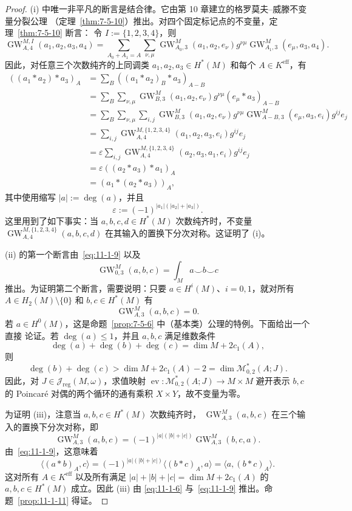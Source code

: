 \begin{proof}
(i) 中唯一非平凡的断言是结合律。它由第 10 章建立的格罗莫夫--威滕不变量分裂公理
（定理~\ref{thm:7-5-10}）推出。对四个固定标记点的不变量，定理~\ref{thm:7-5-10} 断言：
令 $I:=\{1,2,3,4\}$，则
\[
  \operatorname{GW}_{A,4}^{M,I}(a_1,a_2,a_3,a_4)
  =\sum_{A_0+A_1=A}\sum_{\nu,\mu}
  \operatorname{GW}_{A_0,3}^M(a_1,a_2,e_\nu)g^{\nu\mu}
  \operatorname{GW}_{A_1,3}^M(e_\mu,a_3,a_4).
\]
因此，对任意三个次数纯齐的上同调类 $a_1,a_2,a_3\in H^*(M)$ 和每个
$A\in K^{\mathrm{eff}}$，有
\[
\begin{aligned}
  ((a_1*a_2)*a_3)_A
  &=\sum_B((a_1*a_2)_B*a_3)_{A-B}\\
  &=\sum_B\sum_{\nu,\mu}
    \operatorname{GW}_{B,3}^M(a_1,a_2,e_\nu)g^{\nu\mu}
    (e_\mu*a_3)_{A-B}\\
  &=\sum_B\sum_{\nu,\mu}\sum_{i,j}
    \operatorname{GW}_{B,3}^M(a_1,a_2,e_\nu)g^{\nu\mu}
    \operatorname{GW}_{A-B,3}^M(e_\mu,a_3,e_i)g^{ij}e_j\\
  &=\sum_{i,j}\operatorname{GW}_{A,4}^{M,\{1,2,3,4\}}
    (a_1,a_2,a_3,e_i)g^{ij}e_j\\
  &=\varepsilon\sum_{i,j}\operatorname{GW}_{A,4}^{M,\{1,2,3,4\}}
    (a_2,a_3,a_1,e_i)g^{ij}e_j\\
  &=\varepsilon((a_2*a_3)*a_1)_A\\
  &=(a_1*(a_2*a_3))_A,
\end{aligned}
\]
其中使用缩写 $|a|:=\deg(a)$，并且
\[
  \varepsilon:=(-1)^{|a_1|(|a_2|+|a_3|)}.
\]
这里用到了如下事实：当 $a,b,c,d\in H^*(M)$ 次数纯齐时，不变量
$\operatorname{GW}_{A,4}^{M,\{1,2,3,4\}}(a,b,c,d)$ 在其输入的置换下分次对称。这证明了
(i)。

(ii) 的第一个断言由~\eqref{eq:11-1-9} 以及
\[
  \operatorname{GW}_{0,3}^M(a,b,c)=\int_Ma\smile b\smile c
\]
推出。为证明第二个断言，需要说明：只要 $a\in H^i(M)$、$i=0,1$，就对所有
$A\in H_2(M)\setminus\{0\}$ 和 $b,c\in H^*(M)$ 有
\[
  \operatorname{GW}_{A,3}^M(a,b,c)=0.
\]
若 $a\in H^0(M)$，这是命题~\ref{prop:7-5-6} 中（基本类）公理的特例。下面给出一个直接
论证。若 $\deg(a)\le1$，并且 $a,b,c$ 满足维数条件
\[
  \deg(a)+\deg(b)+\deg(c)=\dim M+2c_1(A),
\]
则
\[
  \deg(b)+\deg(c)>\dim M+2c_1(A)-2
  =\dim\mathcal M_{0,2}^*(A;J).
\]
因此，对 $J\in\mathcal J_{\mathrm{reg}}(M,\omega)$，求值映射
$\operatorname{ev}:\mathcal M_{0,2}^*(A;J)\to M\times M$ 避开表示 $b,c$ 的 Poincaré
对偶的两个循环的通有乘积 $X\times Y$，故不变量为零。

为证明 (iii)，注意当 $a,b,c\in H^*(M)$ 次数纯齐时，
$\operatorname{GW}_{A,3}^M(a,b,c)$ 在三个输入的置换下分次对称，即
\[
  \operatorname{GW}_{A,3}^M(a,b,c)
  =(-1)^{|a|(|b|+|c|)}\operatorname{GW}_{A,3}^M(b,c,a).
\]
由~\eqref{eq:11-1-9}，这意味着
\[
  \langle(a*b)_A,c\rangle
  =(-1)^{|a|(|b|+|c|)}\langle(b*c)_A,a\rangle
  =\langle a,(b*c)_A\rangle.
\]
这对所有 $A\in K^{\mathrm{eff}}$ 以及所有满足
$|a|+|b|+|c|=\dim M+2c_1(A)$ 的 $a,b,c\in H^*(M)$ 成立。因此 (iii) 由
\eqref{eq:11-1-6} 与~\eqref{eq:11-1-9} 推出。命题~\ref{prop:11-1-11} 得证。
\end{proof}


